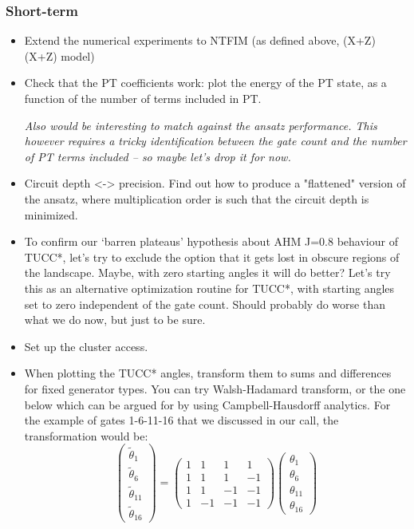 \documentclass[10pt, a4paper]{article}
\begin{document}
\subsubsection*{Short-term}
\begin{itemize}
\item Extend the numerical experiments to NTFIM (as defined above, (X+Z)(X+Z) model)

\item Check that the PT coefficients work: plot the energy of the PT state, as a function of the number of terms included in PT. 

\textit{Also would be interesting to match against the ansatz performance. This however requires a tricky identification between the gate count and the number of PT terms included -- so maybe let's drop it for now.}

\item Circuit depth <-> precision. Find out how to produce a "flattened" version of the ansatz, where multiplication order is such that the circuit depth is minimized. 

\item To confirm our `barren plateaus' hypothesis about AHM J=0.8 behaviour of TUCC*, let's try to exclude the option that it gets lost in obscure regions of the landscape. Maybe, with zero starting angles it will do better? Let's try this as an alternative optimization routine for TUCC*, with starting angles set to zero independent of the gate count. Should probably do worse than what we do now, but just to be sure.

\item Set up the cluster access.

\item When plotting the TUCC* angles, transform them to sums and differences for fixed generator types. You can try Walsh-Hadamard transform, or the one below which can be argued for by using Campbell-Hausdorff analytics. For the example of gates 1-6-11-16 that we discussed in our call, the transformation would be:
\begin{equation}
\begin{pmatrix}
\tilde{\theta}_1 \\
\tilde{\theta}_6 \\
\tilde{\theta}_{11} \\
\tilde{\theta}_{16} 
\end{pmatrix}=\begin{pmatrix}
1 & 1 & 1 & 1\\
1 & 1 & 1 & -1\\
1 & 1 & -1 & -1 \\
1 & -1 & -1 & -1
\end{pmatrix}
\begin{pmatrix}
\theta_1 \\
\theta_6 \\
\theta_{11} \\
\theta_{16} 
\end{pmatrix}
\end{equation}


\end{itemize}
\end{document}
